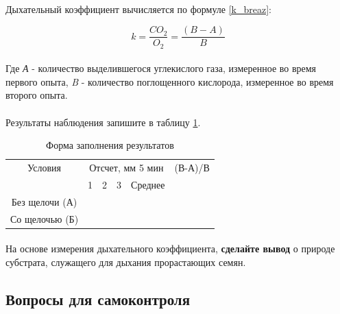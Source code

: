 \paragraph*{}Дыхательный коэффициент вычисляется по формуле \ref{k_breaz}:

\begin{equation}
  \label{k_breaz}
  k = \frac{CO{_2}}{O{_2}} = \frac{(B - A)}{B}
\end{equation} 

\paragraph*{}Где \textit{А} - количество выделившегося углекислого газа, измеренное во время первого опыта, \textit{B} - количество поглощенного кислорода, измеренное во время второго опыта.

\paragraph*{}Результаты наблюдения запишите в таблицу \ref{table_breezing_seeds}.

\begin{table}
\centering
	\label{table_breezing_seeds}
	\caption{Форма заполнения результатов}
	\begin{tabular}{|c|c|c|c|c|c|}
		\hline Условия & \multicolumn{4}{|c|}{Отсчет, мм 5 мин} & (В-А)/В \\ \cline{2-6}
		               &       1      &     2   &   3 & Среднее &         \\ 
		\hline Без щелочи (А)  &      &         &     &         &         \\
		\hline Со щелочью (Б)  &      &         &     &         &         \\
		\hline
	
	\end{tabular}
\end{table}

\paragraph*{}На основе измерения дыхательного коэффициента, \textbf{сделайте вывод} о природе субстрата, служащего для дыхания прорастающих семян.

\subsection*{Вопросы для самоконтроля}

